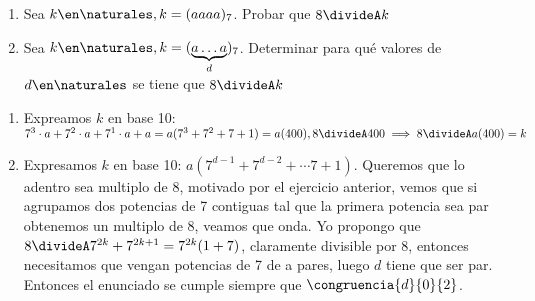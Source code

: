 \begin{enunciado}{\ejercicio}
    \begin{enumerate}[label=(\alph*)]
     \item Sea $k \en \naturales, k = (aaaa)_7$. Probar que $8 \divideA k$
     \item Sea $k \en \naturales, k = (\underbrace{a \ldots a}_{d})_7$. Determinar para qué valores de $d \en \naturales$ 
     se tiene que $8 \divideA k$
    \end{enumerate}
\end{enunciado}

\begin{enumerate}[label=(\alph*)]
    \item Expreamos $k$ en base 10: $7^3 \cdot a + 7^2 \cdot a + 7^1 \cdot a + a = a(7^3 + 7^2 + 7 + 1)
    = a(400), 8 \divideA 400 \implies 8 \divideA a(400) = k$

    \item Expresamos $k$ en base 10: $a(7^{d-1} + 7^{d-2} + \cdots 7 + 1)$. Queremos que lo adentro sea multiplo de 8, motivado
    por el ejercicio anterior, vemos que si agrupamos dos potencias de 7 contiguas tal que la primera potencia sea par obtenemos un multiplo de 8, veamos que onda. 
    Yo propongo que $8 \divideA 7^{2k} + 7^{2k + 1} = 7^{2k}(1 + 7)$, claramente divisible por 8, entonces necesitamos que vengan potencias 
    de 7 de a pares, luego $d$ tiene que ser par. Entonces el enunciado se cumple siempre que $\congruencia{d}{0}{2}$.
\end{enumerate}

\begin{aportes}
 \item {}
\end{aportes}